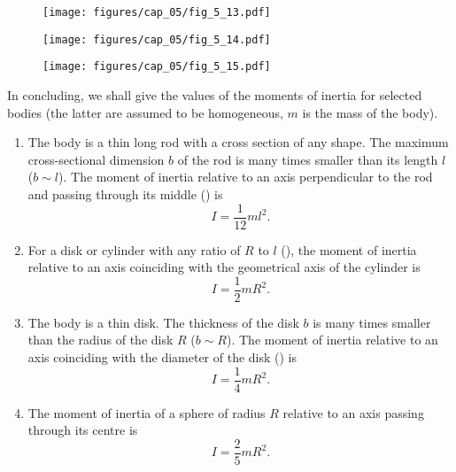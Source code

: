 \begin{figure}[t]
	\begin{minipage}[t]{0.5\linewidth}
		\begin{center}
			\texttt{[image: figures/cap\_05/fig\_5\_13.pdf]}
			\caption[]{}
			\label{fig:5_13}
		\end{center}
	\end{minipage}
	\hspace{-0.05cm}
	\begin{minipage}[t]{0.5\linewidth}
		\begin{center}
			\texttt{[image: figures/cap\_05/fig\_5\_14.pdf]}
			\caption[]{}
			\label{fig:5_14}
		\end{center}
	\end{minipage}
\end{figure}

\begin{figure}[t]
	\begin{center}
		\texttt{[image: figures/cap\_05/fig\_5\_15.pdf]}
		\caption[]{}
		\label{fig:5_15}
	\end{center}
	\vspace{-1.0cm}
\end{figure}

In concluding, we shall give the values of the moments of inertia for selected bodies (the latter are assumed to be homogeneous, $m$ is the mass of the body).
\begin{enumerate}[1.]
	\item The body is a thin long rod with a cross section of any shape. The maximum cross-sectional dimension $b$ of the rod is many times smaller than its length $l$ ($b\sim l$). The moment of inertia relative to an axis perpendicular to the rod and passing through its middle () is
	\begin{equation}\label{eq:5_25}
	I = \frac{1}{12}ml^2.
	\end{equation}

	\item For a disk or cylinder with any ratio of $R$ to $l$ (), the moment of inertia relative to an axis coinciding with the geometrical axis of the cylinder is
	\begin{equation}\label{eq:5_26}
	I = \frac{1}{2}mR^2.
	\end{equation}

	\item The body is a thin disk. The thickness of the disk $b$ is many times smaller than the radius of the disk $R$ ($b\sim R$). The moment of inertia relative to an axis coinciding with the diameter of the disk () is
	\begin{equation}\label{eq:5_27}
		I = \frac{1}{4}mR^2.
	\end{equation}

	\item The moment of inertia of a sphere of radius $R$  relative to an axis passing through its centre is
	\begin{equation}\label{eq:5_28}
		I = \frac{2}{5}mR^2.
	\end{equation}
\end{enumerate}

